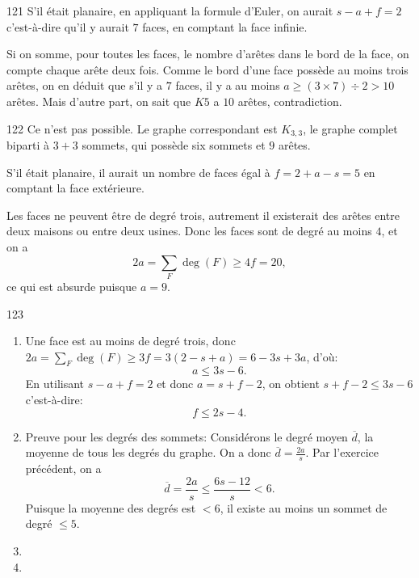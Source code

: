 \begin{Soln}{121}
S'il était planaire, en appliquant la formule d'Euler, on aurait $s-a+f=2$ c'est-à-dire qu'il y aurait $7$ faces, en comptant la face infinie.

Si on somme, pour toutes les faces, le nombre d'arêtes dans le bord de la face, on compte chaque arête deux fois. Comme le bord d'une face possède au moins trois arêtes, on en déduit que s'il y a $7$ faces, il y a au moins $a\geq (3\times 7)\div 2>10$ arêtes. Mais d'autre part, on sait que $K5$ a $10$ arêtes, contradiction.
\end{Soln}
\begin{Soln}{122}
Ce n'est pas possible. Le graphe correspondant est $K_{3,3}$, le graphe complet biparti à  $3+3$ sommets, qui possède six sommets et $9$ arêtes.

\begin{center}
\end{center}

S'il était planaire, il aurait un nombre de faces égal à $f=2+a-s = 5$ en comptant la face extérieure.

Les faces ne peuvent être de degré trois, autrement il existerait des arêtes entre deux maisons ou entre deux usines. Donc les faces sont de degré au moins $4$, et on a
\[ 2a  = \sum_F \operatorname{deg}(F) \geq 4f = 20,\]
ce qui est absurde puisque $a=9$.
\end{Soln}
\begin{Soln}{123}
\begin{enumerate}
\item Une face est au moins de degré trois, donc $2a =\sum_F \operatorname{deg}(F)\geq 3f = 3(2-s+a) = 6-3s+3a$, d'où:
\[ a \leq 3s - 6.\]
En utilisant $s-a+f=2$ et donc $a = s+f-2$, on obtient $s+f-2 \leq 3s-6$ c'est-à-dire:
\[ f \leq 2s-4.\]
\item Preuve pour les degrés des sommets: Considérons le degré moyen $\overline{d}$, la moyenne de tous les degrés du graphe. On a  donc $\overline{d} = \frac{2a}{s}$. Par l'exercice précédent, on a
\[ \overline{d} = \frac{2a}{s} \leq \frac{6s-12}{s} < 6.\]
Puisque la moyenne des degrés est $<6$, il existe au moins un sommet de degré $\leq 5$.
\item
\item
\end{enumerate}
\end{Soln}
